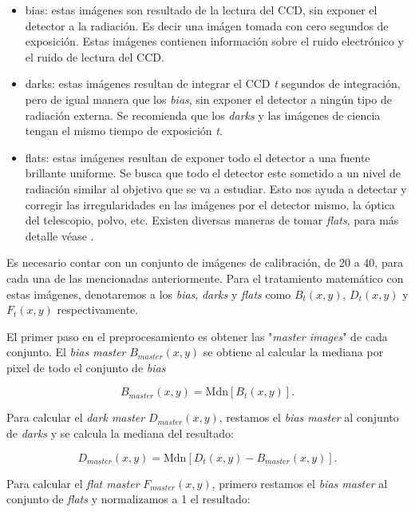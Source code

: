 \begin{itemize}
  \item bias: estas imágenes son resultado de la lectura del CCD, sin exponer el detector a la radiación. Es decir una imágen tomada con cero segundos de exposición. Estas imágenes contienen información sobre el ruido electrónico y el ruido de lectura del CCD. 
  \item darks: estas imágenes resultan de integrar el CCD \textit{t} segundos de integración, pero de igual manera que los \textit{bias}, sin exponer el detector a ningún tipo de radiación externa. Se recomienda que los \textit{darks} y las imágenes de ciencia tengan el mismo tiempo de exposición \textit{t}.
  \item flats: estas imágenes resultan de exponer todo el detector a una fuente brillante uniforme. Se busca que todo el detector este sometido a un nivel de radiación similar al objetivo que se va a estudiar. Esto nos ayuda a detectar  y corregir las irregularidades en las imágenes por el detector mismo, la óptica del telescopio, polvo, etc. Existen diversas maneras de tomar \textit{flats}, para más detalle véase \cite{chromey1996special}.
\end{itemize}

Es necesario contar con un conjunto de imágenes de calibración, de 20 a 40, para cada una de las mencionadas anteriormente. Para el tratamiento matemático con estas imágenes, denotaremos a los \textit{bias}, \textit{darks} y \textit{flats} como $B_{t}(x,y)$, $D_{t}(x,y)$ y $F_{t}(x,y)$ respectivamente.

El primer paso en el preprocesamiento es obtener las "\textit{master images}" de cada conjunto. El \textit{bias master} $B_{master}(x,y)$ se obtiene al calcular la mediana por pixel de todo el conjunto de \textit{bias}

\begin{equation}
  \displaystyle B_{master}(x,y) = \mbox{Mdn} \left[ B_{t}(x,y) \right].
\end{equation}

Para calcular el \textit{dark master} $D_{master}(x,y)$, restamos el \textit{bias master} al conjunto de \textit{darks} y se calcula la mediana del resultado:

\begin{equation}
  \displaystyle D_{master}(x,y) = \mbox{Mdn} \left[ D_{t}(x,y) - B_{master}(x,y)\right].
\end{equation}

Para calcular el \textit{flat master} $F_{master}(x,y)$, primero restamos el \textit{bias master} al conjunto de \textit{flats} y normalizamos a 1 el resultado:

